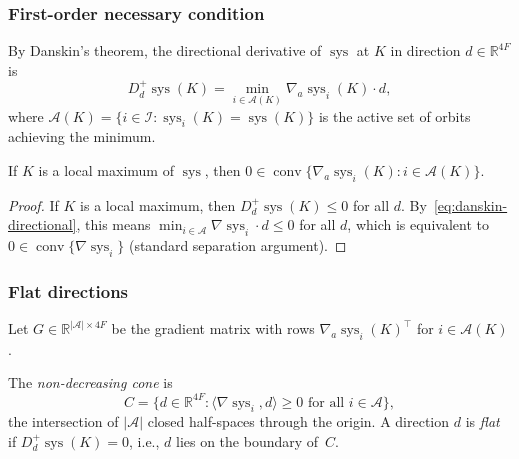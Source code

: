 \subsubsection{First-order necessary condition}

By Danskin's theorem, the directional derivative of $\operatorname{sys}$ at $K$
in direction $d \in \mathbb{R}^{4F}$ is
\begin{equation}\label{eq:danskin-directional}
  D_d^+ \operatorname{sys}(K) = \min_{i \in \mathcal{A}(K)} \nabla_{a} \operatorname{sys}_i(K) \cdot d,
\end{equation}
where $\mathcal{A}(K) = \{i \in \mathcal{I} : \operatorname{sys}_i(K) = \operatorname{sys}(K)\}$
is the active set of orbits achieving the minimum.

\begin{lemma}\label{lem:first-order-necessary}
  If $K$ is a local maximum of $\operatorname{sys}$, then
  $0 \in \operatorname{conv}\{\nabla_{a}\operatorname{sys}_i(K) : i \in \mathcal{A}(K)\}$.
\end{lemma}
\begin{proof}
  If $K$ is a local maximum, then $D_d^+ \operatorname{sys}(K) \leq 0$ for all $d$.
  By~\eqref{eq:danskin-directional}, this means
  $\min_{i \in \mathcal{A}} \nabla\operatorname{sys}_i \cdot d \leq 0$ for all $d$,
  which is equivalent to $0 \in \operatorname{conv}\{\nabla\operatorname{sys}_i\}$
  (standard separation argument).
\end{proof}

\subsubsection{Flat directions}

Let $G \in \mathbb{R}^{|\mathcal{A}| \times 4F}$ be the gradient matrix
with rows $\nabla_a \operatorname{sys}_i(K)^\top$ for $i \in \mathcal{A}(K)$.

\begin{definition}\label{def:flat-directions}
  The \emph{non-decreasing cone} is
  \[
    C = \{d \in \mathbb{R}^{4F} : \langle \nabla\operatorname{sys}_i, d \rangle \geq 0
    \text{ for all } i \in \mathcal{A}\},
  \]
  the intersection of $|\mathcal{A}|$ closed half-spaces through the origin.
  A direction $d$ is \emph{flat} if $D_d^+ \operatorname{sys}(K) = 0$,
  i.e., $d$ lies on the boundary of~$C$.
\end{definition}

